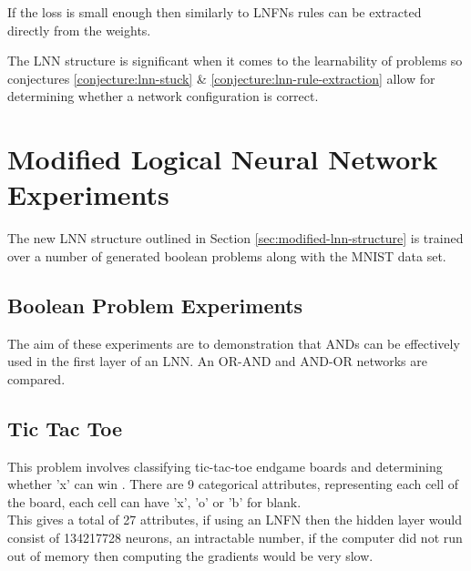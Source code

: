 \begin{conjecture}
	If the loss is small enough then similarly to LNFNs rules can be extracted directly from the weights.
	\label{conjecture:lnn-rule-extraction}
\end{conjecture}

The LNN structure is significant when it comes to the learnability of problems so conjectures \ref{conjecture:lnn-stuck} \& \ref{conjecture:lnn-rule-extraction} allow for determining whether a network configuration is correct.


\section{Modified Logical Neural Network Experiments}
The new LNN structure outlined in Section \ref{sec:modified-lnn-structure} is trained over a number of generated boolean problems along with the MNIST data set.

\subsection{Boolean Problem Experiments}
The aim of these experiments are to demonstration that ANDs can be effectively used in the first layer of an LNN. An OR-AND and AND-OR networks are compared.

\subsection{Tic Tac Toe}
This problem involves classifying tic-tac-toe endgame boards and determining whether 'x' can win \cite{Lichman:2013}. There are 9 categorical attributes, representing each cell of the board, each cell can have 'x', 'o' or 'b' for blank.\\

This gives a total of 27 attributes, if using an LNFN then the hidden layer would consist of 134217728 neurons, an intractable number, if the computer did not run out of memory then computing the gradients would be very slow.

